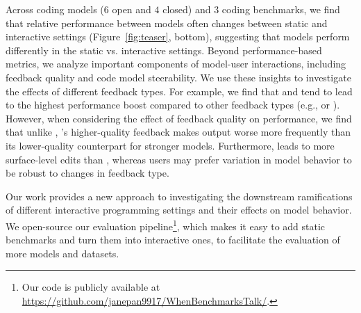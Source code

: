 Across \nmodels{} coding models ($6$ open and $4$ closed) and $3$ coding benchmarks, we find that relative performance between models often changes between static and interactive settings (Figure~\ref{fig:teaser}, bottom), suggesting that models perform differently in the static vs. interactive settings.
Beyond performance-based metrics, we analyze important components of model-user interactions, including feedback quality and code model steerability.
We use these insights to investigate the effects of different feedback types.
For example, we find that \para{} and \cf{} tend to lead to the highest performance boost compared to other feedback types (e.g., \sent{} or \ir). 
However, when considering the effect of feedback quality on performance, we find that unlike \para, \cf 's higher-quality feedback makes output worse more frequently than its lower-quality counterpart for stronger models.
Furthermore, \para{} leads to more surface-level edits than \cf, whereas users may prefer variation in model behavior to be robust to changes in feedback type.



Our work provides a new approach to investigating the downstream ramifications of different interactive programming settings and their effects on model behavior.
We open-source our evaluation pipeline\footnote{Our code is publicly available at \url{https://github.com/janepan9917/WhenBenchmarksTalk/}.}, which makes it easy to add static benchmarks and turn them into interactive ones, to facilitate the evaluation of more models and datasets.
